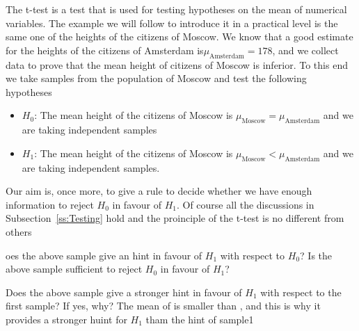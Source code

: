      	The t-test is a test that is used for testing hypotheses on the mean of numerical variables. The example we will follow to introduce it in a practical level is the same one of the heights of the citizens of Moscow. We know that a good estimate for the heights of the citizens of Amsterdam is$\mu_{\text{Amsterdam}} = 178$, and we collect data to prove that the mean height of citizens of Moscow is inferior. To this end we take samples from the population of Moscow and test the following hypotheses
      	\begin{itemize}
      		\item $H_0$: The mean height of the citizens of Moscow is $\mu_{\text{Moscow}} = \mu_{\text{Amsterdam}}$ and we are taking independent samples 
      		\item $ H_1$: The mean height of the citizens of Moscow is $\mu_{\text{Moscow}}< \mu_{\text{Amsterdam}}$ and we are taking independent samples. 
      	\end{itemize}
      	Our aim is, once more, to give a rule to decide whether we have enough information to reject $H_0$ in favour of $H_1$. Of course all the discussions in Subsection~\ref{ss:Testing} hold and the proinciple of the t-test is no different from others
\begin{knitrout}
\color{fgcolor}\begin{kframe}
\begin{alltt}
 \hlkwb{<-} \hldef{(}\hldef{,} \hldef{,} \hldef{,} \hldef{,} \hldef{)}
\end{alltt}
\end{kframe}
\end{knitrout}
oes the above sample give an hint in favour of $H_1$ with respect to $H_0$? Is the above sample sufficient to reject $H_0$ in favour of $H_1$? 
\begin{knitrout}
\color{fgcolor}\begin{kframe}
\begin{alltt}
 \hlkwb{<-} \hldef{(}\hldef{,} \hldef{,} \hldef{,} \hldef{,} \hldef{)}
\end{alltt}
\end{kframe}
\end{knitrout}
      	Does the above sample give a stronger hint in favour of $H_1$ with respect to the first sample? If yes, why? The mean of  is smaller than , and this is why it provides a stronger huint for $H_1$ tham the hint of sample1 
